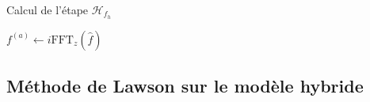 \begin{algorithm}
  \caption{Calcul de l'étape $\mathcal{H}_{f_h}$}
  \label{alg:Hfh}
  \begin{algorithmic}[1]
      \State $f^{(a)} \gets i\text{FFT}_z(\hat{f})$
      \State {}
      \State {}
      \State {}
    \EndFunction
  \end{algorithmic}
\end{algorithm}


\FloatBarrier
\subsection{Méthode de Lawson sur le modèle hybride}

